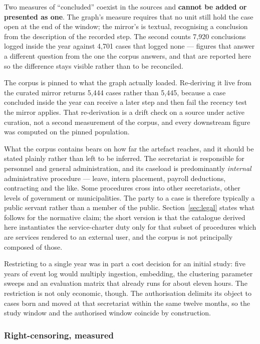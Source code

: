 Two measures of ``concluded'' coexist in the sources and \textbf{cannot be added or presented
as one}. The graph's measure requires that no unit still hold the case open at the end of the
window; the mirror's is textual, recognising a conclusion from the description of the recorded
step. The second counts 7{,}920 conclusions logged inside the year against 4{,}701 cases that
logged none --- figures that answer a different question from the one the corpus answers, and
that are reported here so the difference stays visible rather than to be reconciled.

The corpus is pinned to what the graph actually loaded. Re-deriving it live from the curated
mirror returns 5{,}444 cases rather than 5{,}445, because a case concluded inside the year can
receive a later step and then fail the recency test the mirror applies. That re-derivation is a
drift check on a source under active curation, not a second measurement of the corpus, and
every downstream figure was computed on the pinned population.

What the corpus contains bears on how far the artefact reaches, and it should be stated plainly
rather than left to be inferred. The secretariat is responsible for personnel and general
administration, and its caseload is predominantly \emph{internal} administrative procedure ---
leave, intern placement, payroll deductions, contracting and the like. Some procedures cross
into other secretariats, other levels of government or municipalities. The party to a case is
therefore typically a public servant rather than a member of the public. Section~\ref{sec:legal}
states what follows for the normative claim; the short version is that the catalogue derived
here instantiates the service-charter duty only for that subset of procedures which are services
rendered to an external user, and the corpus is not principally composed of those.

Restricting to a single year was in part a cost decision for an initial study: five years of
event log would multiply ingestion, embedding, the clustering parameter sweeps and an
evaluation matrix that already runs for about eleven hours. The restriction is not only
economic, though. The authorisation delimits its object to cases born and moved at that
secretariat within the same twelve months, so the study window and the authorised window
coincide by construction.

\subsubsection{Right-censoring, measured}\label{sec:bias}


